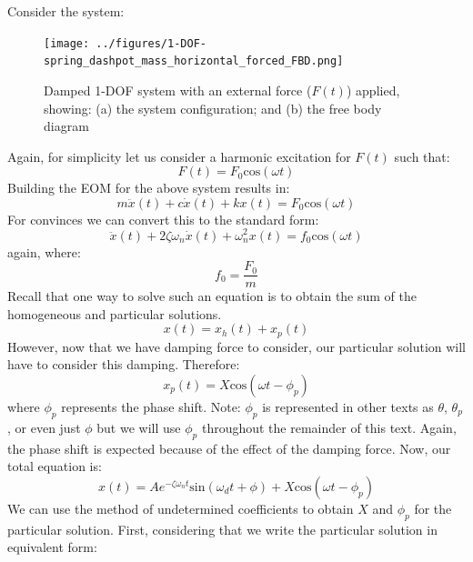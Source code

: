 \documentclass[12pt,letter]{article}
\numberwithin{ex}{section} %
\numberwithin{re}{section} %
\numberwithin{pr}{section} %
\begin{document}
			Consider the system:
			\begin{figure}[H]
				\centering
				\texttt{[image: ../figures/1-DOF-spring\_dashpot\_mass\_horizontal\_forced\_FBD.png]}
				\caption{Damped 1-DOF system with an external force ($F(t)$) applied, showing: (a) the system configuration; and (b) the free body diagram}
			\end{figure}	
			\noindent Again, for simplicity let us consider a harmonic excitation for $F(t)$ such that:
			\begin{equation}
				F(t) = F_0\text{cos}(\omega t)
			\end{equation}							
			Building the EOM for the above system results in:
			\begin{equation}
				m \ddot{x}(t)+c\dot{x}(t)+kx(t) = F_0\text{cos}(\omega t)
			\end{equation}			
			For convinces we can convert this to the standard form:					
			\begin{equation}
				\ddot{x}(t)+2 \zeta \omega_n \dot{x}(t) +\omega_n^2x(t) = f_0\text{cos}(\omega t)
			\end{equation}					
			again, where:
			\begin{equation}
				f_0 = \frac{F_0}{m}
			\end{equation}	
			Recall that one way to solve such an equation is to obtain the sum of the homogeneous and particular solutions. 
			\begin{equation}
				x(t) = x_h(t) + x_p(t)
			\end{equation}	
			However, now that we have damping force to consider, our particular solution will have to consider this damping. Therefore:
			\begin{equation}
				\label{eq:x_p(t)}
				x_p(t) = X \text{cos}(\omega t - \phi_p)
			\end{equation}
			where $\phi_p$ represents the phase shift. Note: $\phi_p$ is represented in other texts as $\theta$, $\theta_p$, or even just $\phi$ but we will use $\phi_p$ throughout the remainder of this text. Again, the phase shift is expected because of the effect of the damping force. Now, our total equation is:
			\begin{equation}
				x(t) = Ae^{-\zeta \omega_n t}\text{sin}(\omega_d t + \phi) +  X \text{cos}(\omega t - \phi_p)
			\end{equation}			
			We can use the method of undetermined coefficients to obtain $X$ and $\phi_p$ for the particular solution. First, considering that we write the particular solution in equivalent form:
\end{document}
